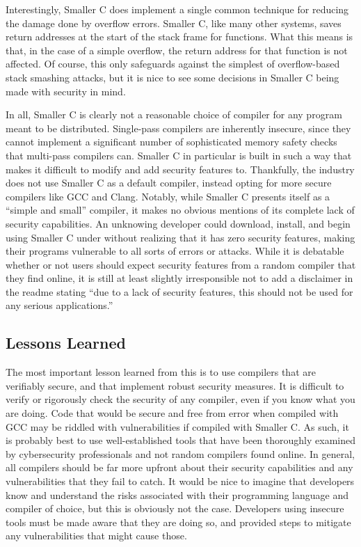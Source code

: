 \documentclass[sigconf, anonymous]{acmart}
\begin{document}
Interestingly, Smaller C does implement a single common technique for reducing the damage done by overflow errors. Smaller C, like many other systems, saves return addresses at the start of the stack frame for functions. What this means is that, in the case of a simple overflow, the return address for that function is not affected. Of course, this only safeguards against the simplest of overflow-based stack smashing attacks, but it is nice to see some decisions in Smaller C being made with security in mind.

In all, Smaller C is clearly not a reasonable choice of compiler for any program meant to be distributed. Single-pass compilers are inherently insecure, since they cannot implement a significant number of sophisticated memory safety checks that multi-pass compilers can. Smaller C in particular is built in such a way that makes it difficult to modify and add security features to. Thankfully, the industry does not use Smaller C as a default compiler, instead opting for more secure compilers like GCC and Clang. Notably, while Smaller C presents itself as a “simple and small” compiler, it makes no obvious mentions of its complete lack of security capabilities. An unknowing developer could download, install, and begin using Smaller C under without realizing that it has zero security features, making their programs vulnerable to all sorts of errors or attacks. While it is debatable whether or not users should expect security features from a random compiler that they find online, it is still at least slightly irresponsible not to add a disclaimer in the readme stating “due to a lack of security features, this should not be used for any serious applications.” 

\subsection{Lessons Learned}

The most important lesson learned from this is to use compilers that are verifiably secure, and that implement robust security measures. It is difficult to verify or rigorously check the security of any compiler, even if you know what you are doing. Code that would be secure and free from error when compiled with GCC may be riddled with vulnerabilities if compiled with Smaller C. As such, it is probably best to use well-established tools that have been thoroughly examined by cybersecurity professionals and not random compilers found online. In general, all compilers should be far more upfront about their security capabilities and any vulnerabilities that they fail to catch. It would be nice to imagine that developers know and understand the risks associated with their programming language and compiler of choice, but this is obviously not the case. Developers using insecure tools must be made aware that they are doing so, and provided steps to mitigate any vulnerabilities that might cause those. 
\end{document}
